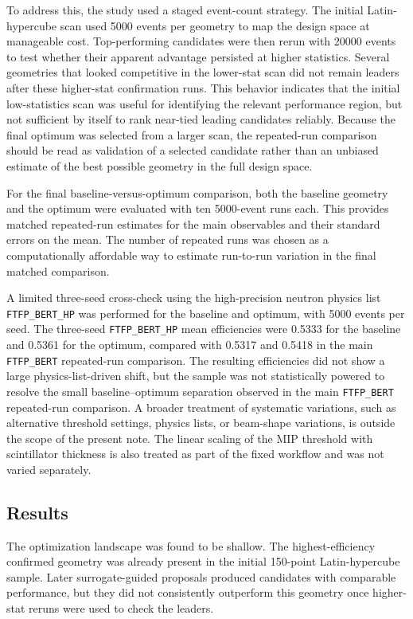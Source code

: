 \noindent To address this, the study used a staged event-count strategy. The initial Latin-hypercube scan used 5000 events per geometry to map the design space at manageable cost.
Top-performing candidates were then rerun with 20000 events to test whether their apparent advantage persisted at higher statistics. Several geometries that looked competitive in
the lower-stat scan did not remain leaders after these higher-stat confirmation runs. This behavior indicates that the initial low-statistics scan was useful for identifying the relevant performance region, but not sufficient by itself to rank near-tied leading candidates reliably. Because the final optimum was selected from a larger scan, the repeated-run comparison should be read as validation of a selected candidate rather than an unbiased estimate of the best possible geometry in the full design space.

\noindent For the final baseline-versus-optimum comparison, both the baseline geometry and the optimum were evaluated with ten 5000-event runs each. This provides matched repeated-run
estimates for the main observables and their standard errors on the mean. The number of repeated runs was chosen as a computationally affordable way to estimate run-to-run variation in the
final matched comparison.

\noindent A limited three-seed cross-check using the high-precision neutron physics list \texttt{FTFP\_BERT\_HP} was performed for the baseline and optimum, with 5000 events per seed. The three-seed \texttt{FTFP\_BERT\_HP} mean efficiencies were 0.5333 for the baseline and 0.5361 for the optimum, compared with 0.5317 and 0.5418 in the main \texttt{FTFP\_BERT} repeated-run comparison. The resulting efficiencies did not show a large physics-list-driven shift, but the sample was not statistically powered to resolve the small baseline--optimum separation observed in the main \texttt{FTFP\_BERT} repeated-run comparison. A broader treatment of systematic variations, such as alternative threshold settings, physics lists, or beam-shape variations, is outside the scope of the present note. The linear scaling of the MIP threshold with scintillator thickness is also treated as part of the fixed workflow and was not varied separately.


\subsection{Results}

\noindent The optimization landscape was found to be shallow. The highest-efficiency confirmed geometry was already present in the initial 150-point Latin-hypercube sample.
Later surrogate-guided proposals produced candidates with comparable performance, but they did not consistently outperform this geometry once higher-stat reruns were
used to check the leaders.

